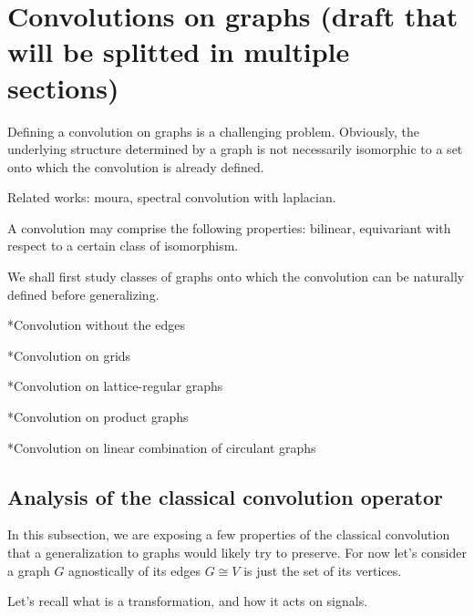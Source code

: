 \section{Convolutions on graphs (draft that will be splitted in multiple sections)}

Defining a convolution on graphs is a challenging problem. Obviously, the underlying structure determined by a graph is not necessarily isomorphic to a set onto which the convolution is already defined. 

Related works: moura, spectral convolution with laplacian.

A convolution may comprise the following properties: bilinear, equivariant with respect to a certain class of isomorphism.

We shall first study classes of graphs onto which the convolution can be naturally defined before generalizing.

*Convolution without the edges

*Convolution on grids

*Convolution on lattice-regular graphs

*Convolution on product graphs

*Convolution on linear combination of circulant graphs


\subsection{Analysis of the classical convolution operator}

In this subsection, we are exposing a few properties of the classical convolution that a generalization to graphs would likely try to preserve. For now let's consider a graph $G$ agnostically of its edges \ie $G \cong V$ is just the set of its vertices.

Let's recall what is a transformation, and how it acts on signals.

